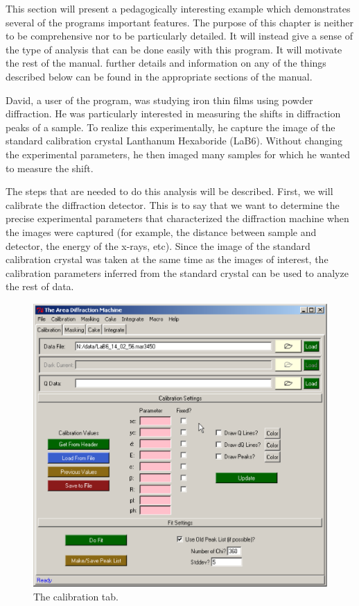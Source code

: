 This section will present a pedagogically interesting 
example which demonstrates several of the programs important
features.  The purpose of this chapter is neither to be 
comprehensive nor to be particularly detailed. It will instead 
give a sense of the type of analysis that can be done easily with 
this program. It will motivate the rest of the manual. further details 
and information on any of the things described below can be found in 
the appropriate sections of the manual.

David, a user of the program, was studying iron thin films 
using powder diffraction. He was particularly interested in 
measuring the shifts in diffraction peaks of a sample. To 
realize this experimentally, he capture the image of the 
standard calibration crystal Lanthanum Hexaboride (LaB6). 
Without changing the experimental parameters, he then imaged 
many samples for which he wanted to measure the shift.

The steps that are needed to do this analysis will be
described. First, we will calibrate the diffraction detector.
This is to say that we want to determine the precise 
experimental parameters that characterized the diffraction
machine when the images were captured (for example, the distance
between sample and detector, the energy of the x-rays, etc). Since 
the image of the standard calibration crystal was taken at the same
time as the images of interest, the calibration parameters inferred
from the standard crystal can be used to analyze the
rest of data.

\begin{figure}
    \centering
    \includegraphics[scale=.75]{figures/calibration_tab.eps}
    \caption{The calibration tab.}
    \label{calibration_tab_example}
\end{figure}


